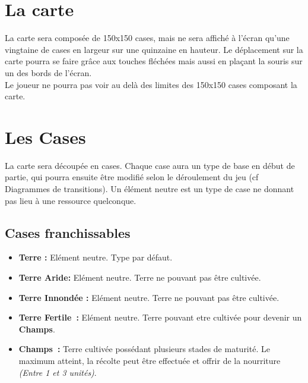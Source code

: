 \documentclass[a4paper]{article}
\begin{document}
    \section{La carte}

      La carte sera composée de 150x150 cases, mais ne sera affiché à l'écran qu'une vingtaine de cases en largeur sur une quinzaine en hauteur. Le déplacement sur la carte pourra se faire grâce aux touches fléchées mais aussi en plaçant la souris sur un des bords de l'écran.\\
      Le joueur ne pourra pas voir au delà des limites des 150x150 cases composant la carte.

    \section{Les Cases}

      La carte sera découpée en cases. Chaque case aura un type de base en début de partie, qui pourra ensuite être modifié selon le déroulement du jeu (cf Diagrammes de transitions). Un élément neutre est un type de case ne donnant pas lieu à une ressource quelconque.

      \subsection{Cases franchissables}
        \begin{itemize}
          \item \textbf{Terre :} \small{ Elément neutre. Type par défaut.}
          \item \textbf{Terre Aride:} \small{ Elément neutre. Terre ne pouvant pas être cultivée.}
          \item \textbf{Terre Innondée :} \small{ Elément neutre. Terre ne pouvant pas être cultivée.}
          \item \textbf{Terre Fertile :} \small{ Elément neutre. Terre pouvant etre cultivée pour devenir un \textbf{Champs}.}
          \item \textbf{Champs :} \small{ Terre cultivée possédant plusieurs stades de maturité. Le maximum atteint, la récolte peut être effectuée et offrir de la nourriture \textit{(Entre 1 et 3 unités)}.}
        \end{itemize}
\end{document}
